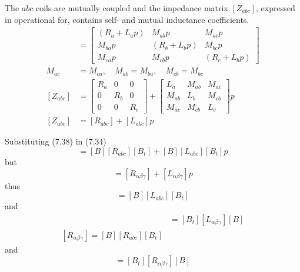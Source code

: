 \documentclass[a4paper,numbers=noenddot,12pt]{scrbook}
\begin{document}
    The $abc$ coils are mutually coupled and the impedance matrix $[Z_{abc}]$, expressed in operational for, contains self- and mutual inductance coefficients.
    \begin{align}
        [Z_{abc}]
        & =
        \begin{bmatrix}
            (R_a + L_a p) & M_{ab} p & M_{ac} p \\
            M_{ba} p & (R_b + L_b p) & M_{bc} p \\
            M_{ca} p & M_{cb} p & (R_c + L_b p)
        \end{bmatrix} \\
        M_{ac} & = M_{ca}, \quad M_{ab} = M_{ba}, \quad M_{cb} = M_{bc} \nonumber \\
        [Z_{abc}] & =
        \begin{bmatrix}
            R_a & 0 & 0 \\
            0 & R_b & 0 \\
            0 & 0 & R_c
        \end{bmatrix}
        +
        \begin{bmatrix}
            L_a & M_{ab} & M_{ac} \\
            M_{ab} & L_b & M_{cb} \\
            M_{ac} & M_{cb} & L_c
        \end{bmatrix}
        p \\
        [Z_{abc}] & = [R_{abc}] + [L_{abc}] p
        \label{eq:Eq7.38}
    \end{align}

    Substituting (7.38) in (7.34)
    \begin{equation}
        [Z_{\alpha \beta \gamma}] = [B][R_{abc}][B_t] + [B][L_{abc}][B_t]p
        \label{eq:Eq7.39}
    \end{equation}
    but
    \begin{equation}
        [Z_{\alpha \beta \gamma}] = [R_{\alpha \beta \gamma}] + [L_{\alpha \beta \gamma}]p
        \label{eq:Eq7.40}
    \end{equation}
    thus
    \begin{equation}
        [L_{\alpha \beta \gamma}] = [B][L_{abc}][B_t]
        \label{eq:Eq7.41}
    \end{equation}
    and
    \begin{align}
        [L_{abc}] & = [B_t][L_{\alpha \beta \gamma}][B] \\
        [R_{\alpha \beta \gamma}] = [B][R_{abc}][B_t]
        \label{eq:Eq7.43}
    \end{align}
    and
    \begin{equation}
        [R_{abc}] = [B_t][R_{\alpha \beta \gamma}][B]
        \label{eq:Eq7.44}
    \end{equation}
\end{document}
